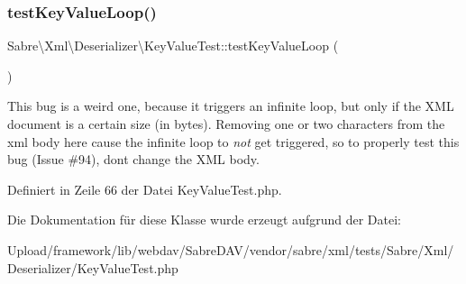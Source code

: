 \subsubsection{\texorpdfstring{test\+Key\+Value\+Loop()}{testKeyValueLoop()}}
{\footnotesize\ttfamily Sabre\textbackslash{}\+Xml\textbackslash{}\+Deserializer\textbackslash{}\+Key\+Value\+Test\+::test\+Key\+Value\+Loop (\begin{DoxyParamCaption}{ }\end{DoxyParamCaption})}

This bug is a weird one, because it triggers an infinite loop, but only if the X\+ML document is a certain size (in bytes). Removing one or two characters from the xml body here cause the infinite loop to {\itshape not} get triggered, so to properly test this bug (Issue \#94), don\textquotesingle{}t change the X\+ML body.

Definiert in Zeile 66 der Datei Key\+Value\+Test.\+php.



Die Dokumentation für diese Klasse wurde erzeugt aufgrund der Datei\+:\begin{DoxyCompactItemize}
\item 
Upload/framework/lib/webdav/\+Sabre\+D\+A\+V/vendor/sabre/xml/tests/\+Sabre/\+Xml/\+Deserializer/Key\+Value\+Test.\+php\end{DoxyCompactItemize}
